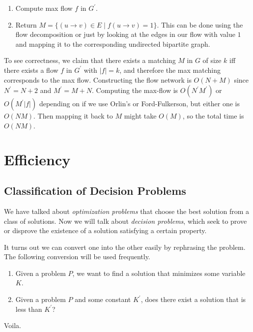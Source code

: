 \documentclass{article}
\begin{document}
\begin{example}
\begin{enumerate}
        \item Compute max flow $f$ in $G^\prime$. 
        \item Return $M = \{ (u \rightarrow v) \in E \mid f(u \rightarrow v) = 1 \}$. This can be done using the flow decomposition or just by looking at the edges in our flow with value $1$ and mapping it to the corresponding undirected bipartite graph. 
      \end{enumerate}
      To see correctness, we claim that there exists a matching $M$ in $G$ of size $k$ iff there exists a flow $f$ in $G^\prime$ with $|f|= k$, and therefore the max matching corresponds to the max flow. Constructing the flow network is $O(N + M)$ since $N^\prime = N + 2$ and $M^\prime = M + N$. Computing the max-flow is $O(N^\prime M^\prime)$ or $O(M^\prime |f|)$ depending on if we use Orlin's or Ford-Fulkerson, but either one is $O(NM)$. Then mapping it back to $M$ might take $O(M)$, so the total time is $O(NM)$. 
    \end{example}

\section{Efficiency} 
  
  \subsection{Classification of Decision Problems}

    We have talked about \textit{optimization problems} that choose the best solution from a class of solutions. Now we will talk about \textit{decision problems}, which seek to prove or disprove the existence of a solution satisfying a certain property. 

    \begin{lemma}
      It turns out we can convert one into the other easily by rephrasing the problem. The following conversion will be used frequently.  
      \begin{enumerate}
        \item Given a problem $P$, we want to find a solution that minimizes some variable $K$. 
        \item Given a problem $P$ and some constant $K^\prime$, does there exist a solution that is less than $K^\prime$? 
      \end{enumerate}
      Voila.  
    \end{lemma}
\end{document}
